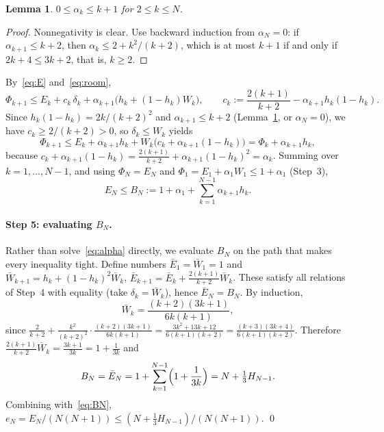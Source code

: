 \documentclass[11pt]{article}
\newtheorem{lemma}[theorem]{Lemma}
\theoremstyle{remark}
\begin{document}
\begin{lemma}\label{lem:alpha}
$0\le\alpha_k\le k+1$ for $2\le k\le N$.
\end{lemma}

\begin{proof}
Nonnegativity is clear. Use backward induction from $\alpha_N=0$: if
$\alpha_{k+1}\le k+2$, then $\alpha_k\le2+k^2/(k+2)$, which is at most $k+1$ if and
only if $2k+4\le3k+2$, that is, $k\ge2$.
\end{proof}

By~\eqref{eq:E} and~\eqref{eq:room},
\[
  \Phi_{k+1}\le E_k+c_k\,\delta_k+\alpha_{k+1}\bigl(h_k+(1-h_k)W_k\bigr),\qquad
  c_k:=\frac{2(k+1)}{k+2}-\alpha_{k+1}h_k(1-h_k).
\]
Since $h_k(1-h_k)=2k/(k+2)^2$ and $\alpha_{k+1}\le k+2$ (Lemma~\ref{lem:alpha}, or
$\alpha_N=0$), we have $c_k\ge2/(k+2)>0$, so $\delta_k\le W_k$ yields
\[
  \Phi_{k+1}\le E_k+\alpha_{k+1}h_k+W_k\bigl(c_k+\alpha_{k+1}(1-h_k)\bigr)
  =\Phi_k+\alpha_{k+1}h_k,
\]
because $c_k+\alpha_{k+1}(1-h_k)=\frac{2(k+1)}{k+2}+\alpha_{k+1}(1-h_k)^2=\alpha_k$.
Summing over $k=1,\dots,N-1$, and using $\Phi_N=E_N$ and
$\Phi_1=E_1+\alpha_1W_1\le1+\alpha_1$ (Step~3),
\begin{equation}\label{eq:BN}
  E_N\le B_N:=1+\alpha_1+\sum_{k=1}^{N-1}\alpha_{k+1}h_k .
\end{equation}

\paragraph{Step 5: evaluating $B_N$.}
Rather than solve~\eqref{eq:alpha} directly, we evaluate $B_N$ on the path that
makes every inequality tight. Define numbers $\bar E_1=\bar W_1=1$ and
$\bar W_{k+1}=h_k+(1-h_k)^2\bar W_k$,
$\bar E_{k+1}=\bar E_k+\frac{2(k+1)}{k+2}\bar W_k$. These satisfy all relations of
Step~4 with equality (take $\delta_k=\bar W_k$), hence $\bar E_N=B_N$. By induction,
\[
  \bar W_k=\frac{(k+2)(3k+1)}{6k(k+1)},
\]
since
$\frac{2}{k+2}+\frac{k^2}{(k+2)^2}\cdot\frac{(k+2)(3k+1)}{6k(k+1)}
=\frac{3k^2+13k+12}{6(k+1)(k+2)}=\frac{(k+3)(3k+4)}{6(k+1)(k+2)}$.
Therefore $\frac{2(k+1)}{k+2}\bar W_k=\frac{3k+1}{3k}=1+\frac1{3k}$ and
\[
  B_N=\bar E_N=1+\sum_{k=1}^{N-1}\Bigl(1+\frac1{3k}\Bigr)=N+\tfrac13H_{N-1}.
\]
Combining with~\eqref{eq:BN}, $e_N=E_N/(N(N+1))\le(N+\frac13H_{N-1})/(N(N+1))$.
\qed
\end{document}
